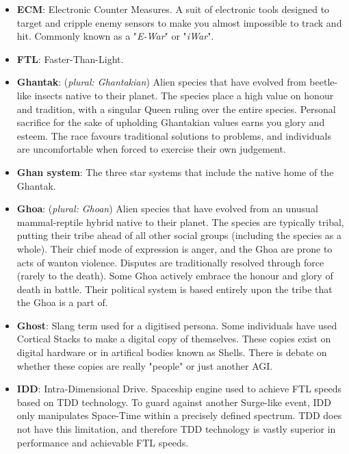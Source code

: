 \documentclass[10pt,twoside]{article}
\begin{document}
\begin{multicols}{2}
\begin{itemize}
    \item \textbf{ECM}: Electronic Counter Measures. A suit of electronic tools designed to target and cripple enemy sensors to make you almost impossible to track and hit. Commonly known as a "\textit{E-War}" or "\textit{iWar}".

    \item \textbf{FTL}: Faster-Than-Light.

    \item \textbf{Ghantak}: (\textit{plural: Ghantakian}) Alien species that have evolved from beetle-like insects native to their planet. The species place a high value on honour and tradition, with a singular Queen ruling over the entire species. Personal sacrifice for the sake of upholding Ghantakian values earns you glory and esteem. The race favours traditional solutions to problems, and individuals are uncomfortable when forced to exercise their own judgement.

    \item \textbf{Ghan system}: The three star systems that include the native home of the Ghantak.

    \item \textbf{Ghoa}: (\textit{plural: Ghoan}) Alien species that have evolved from an unusual mammal-reptile hybrid native to their planet. The species are typically tribal, putting their tribe ahead of all other social groups (including the species as a whole). Their chief mode of expression is anger, and the Ghoa are prone to acts of wanton violence. Disputes are traditionally resolved through force (rarely to the death). Some Ghoa actively embrace the honour and glory of death in battle. Their political system is based entirely upon the tribe that the Ghoa is a part of.

    \item \textbf{Ghost}: Slang term used for a digitised persona. Some individuals have used Cortical Stacks to make a digital copy of themselves. These copies exist on digital hardware or in artifical bodies known as Shells. There is debate on whether these copies are really "people" or just another AGI.

    \item \textbf{IDD}: Intra-Dimensional Drive. Spaceship engine used to achieve FTL speeds based on TDD technology. To guard against another Surge-like event, IDD only manipulates Space-Time within a precisely defined spectrum. TDD does not have this limitation, and therefore TDD technology is vastly superior in performance and achievable FTL speeds.


\end{itemize}
\end{multicols}
\end{document}
